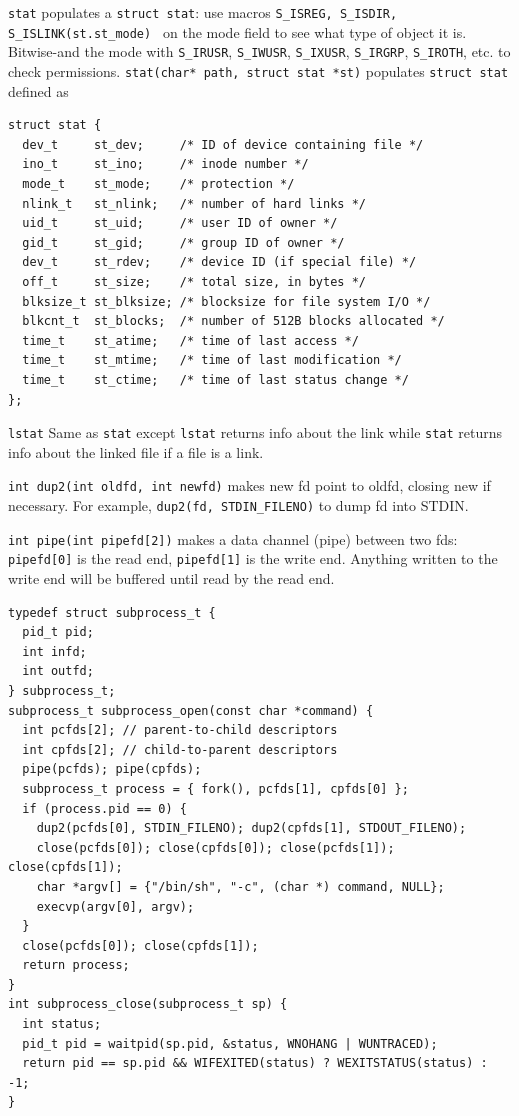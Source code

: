\documentclass{article}
\begin{document}
\begin{multicols}{2}
  {\tt stat} populates a {\tt struct stat}: use macros
  {\tt S\_ISREG, S\_ISDIR, S\_ISLINK(st.st\_mode) } on the mode field to see
  what type of object it is. Bitwise-and the mode with \texttt{S\_IRUSR},
  \texttt{S\_IWUSR}, \texttt{S\_IXUSR}, \texttt{S\_IRGRP}, \texttt{S\_IROTH},
  etc. to check permissions.
  {\tt stat(char* path, struct stat *st)} populates \texttt{struct stat} defined
  as
  {\footnotesize
  \begin{verbatim}
struct stat {
  dev_t     st_dev;     /* ID of device containing file */
  ino_t     st_ino;     /* inode number */
  mode_t    st_mode;    /* protection */
  nlink_t   st_nlink;   /* number of hard links */
  uid_t     st_uid;     /* user ID of owner */
  gid_t     st_gid;     /* group ID of owner */
  dev_t     st_rdev;    /* device ID (if special file) */
  off_t     st_size;    /* total size, in bytes */
  blksize_t st_blksize; /* blocksize for file system I/O */
  blkcnt_t  st_blocks;  /* number of 512B blocks allocated */
  time_t    st_atime;   /* time of last access */
  time_t    st_mtime;   /* time of last modification */
  time_t    st_ctime;   /* time of last status change */
}; \end{verbatim}}
  {\tt lstat} Same as {\tt stat} except {\tt lstat} returns info about the
  link while {\tt stat} returns info about the linked file if a file is a link.

  {\tt int dup2(int oldfd, int newfd)} makes new fd point to oldfd, closing new
  if necessary. For example, {\tt dup2(fd, STDIN\_FILENO)} to dump fd into STDIN.

  \texttt{int pipe(int pipefd[2])} makes a data channel (pipe) between two fds:
  \texttt{pipefd[0]} is the read end, \texttt{pipefd[1]} is the write end.
  Anything written to the write end will be buffered until read by the read end.
  {\scriptsize
  \begin{verbatim}
typedef struct subprocess_t {
  pid_t pid;
  int infd;
  int outfd;
} subprocess_t;
subprocess_t subprocess_open(const char *command) {
  int pcfds[2]; // parent-to-child descriptors
  int cpfds[2]; // child-to-parent descriptors
  pipe(pcfds); pipe(cpfds);
  subprocess_t process = { fork(), pcfds[1], cpfds[0] };
  if (process.pid == 0) {
    dup2(pcfds[0], STDIN_FILENO); dup2(cpfds[1], STDOUT_FILENO);
    close(pcfds[0]); close(cpfds[0]); close(pcfds[1]); close(cpfds[1]);
    char *argv[] = {"/bin/sh", "-c", (char *) command, NULL};
    execvp(argv[0], argv);
  }
  close(pcfds[0]); close(cpfds[1]);
  return process;
}
int subprocess_close(subprocess_t sp) {
  int status;
  pid_t pid = waitpid(sp.pid, &status, WNOHANG | WUNTRACED);
  return pid == sp.pid && WIFEXITED(status) ? WEXITSTATUS(status) : -1;
}
\end{verbatim}}


\end{multicols}
\end{document}
